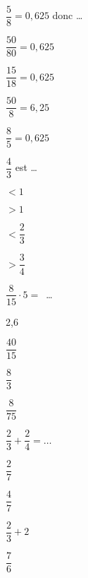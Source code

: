 \begin{QCM}
  \begin{GroupeQCM}
  
     \begin{exercice}
      $\dfrac{5}{8} = 0,625$ donc \ldots
      \begin{ChoixQCM}{4}
      \item $\dfrac{50}{80} = 0,625$
      \item $\dfrac{15}{18} = 0,625$
      \item $\dfrac{50}{8} = 6,25$
      \item $\dfrac{8}{5} = 0,625$      
      \end{ChoixQCM}
\begin{corrige}
   \end{corrige}
    \end{exercice}
  
    \begin{exercice}
      $\dfrac{4}{3}$ est \ldots
      \begin{ChoixQCM}{4}
      \item $< 1$
      \item $> 1$
      \item $< \dfrac{2}{3}$
      \item $> \dfrac{3}{4}$
      \end{ChoixQCM}
\begin{corrige}
   \end{corrige}
    \end{exercice}
    
    
    \begin{exercice}
      $\dfrac{8}{15} \cdot 5 =$ \ldots
      \begin{ChoixQCM}{4}
      \item 2,6
      \item $\dfrac{40}{15}$
      \item $\dfrac{8}{3}$
      \item $\dfrac{8}{75}$
      \end{ChoixQCM}
\begin{corrige}
   \end{corrige}
    \end{exercice}
    
 

    \begin{exercice}
      $\dfrac{2}{3} + \dfrac{2}{4} = \ldots$
      \begin{ChoixQCM}{4}
      \item $\dfrac{2}{7}$
      \item $\dfrac{4}{7}$
      \item $\dfrac{2}{3} + 2$
      \item $\dfrac{7}{6}$
      \end{ChoixQCM}
\begin{corrige}
   \end{corrige}
    \end{exercice}


\end{GroupeQCM}
\end{QCM}

  
